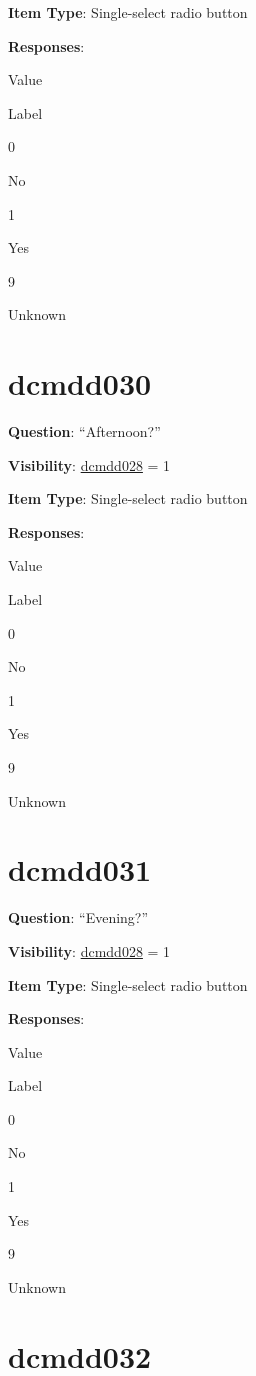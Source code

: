 \documentclass[
]{book}
\begin{document}
\textbf{Item Type}: Single-select radio button

\textbf{Responses}:

Value

Label

0

No

1

Yes

9

Unknown

\hypertarget{dcmdd030}{%
\section{dcmdd030}\label{dcmdd030}}

\textbf{Question}: ``Afternoon?''

\textbf{Visibility}: \protect\hyperlink{dcmdd028}{dcmdd028} = 1

\textbf{Item Type}: Single-select radio button

\textbf{Responses}:

Value

Label

0

No

1

Yes

9

Unknown

\hypertarget{dcmdd031}{%
\section{dcmdd031}\label{dcmdd031}}

\textbf{Question}: ``Evening?''

\textbf{Visibility}: \protect\hyperlink{dcmdd028}{dcmdd028} = 1

\textbf{Item Type}: Single-select radio button

\textbf{Responses}:

Value

Label

0

No

1

Yes

9

Unknown

\hypertarget{dcmdd032}{%
\section{dcmdd032}\label{dcmdd032}}
\end{document}
